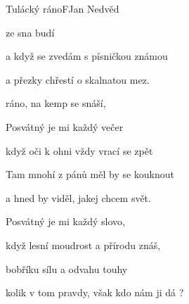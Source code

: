 \begin{song}{Tulácký ráno}{F}{Jan Nedvěd}

\begin{SBVerse}


 ze sna budí 

a když se zvedám s písničkou známou

a přezky chřestí o skalnatou mez.

\end{SBVerse}

\begin{SBChorus}

 ráno, na kemp se snáší,




\end{SBChorus}

\begin{SBVerse}

Posvátný je mi každý večer

když oči k ohni vždy vrací se zpět

Tam mnohí z pánů měl by se kouknout

a hned by viděl, jakej chcem svět.

\end{SBVerse}

\begin{SBVerse}

Posvátný je mi každý slovo,

když lesní moudrost a přírodu znáš,

bobříku sílu a odvahu touhy

kolik v tom pravdy, však kdo nám ji dá ?

\end{SBVerse}

\end{song}

\pagebreak